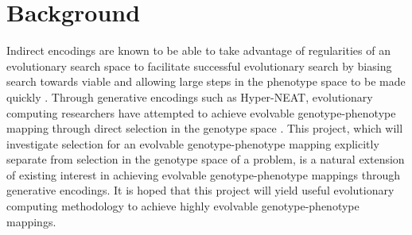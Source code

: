 \section{Background} \label{sec:background}

Indirect encodings are known to be able to take advantage of regularities of an evolutionary search space to facilitate successful evolutionary search by biasing search towards viable and allowing large steps in the phenotype space to be made quickly \cite{clune2009evolving}.
Through generative encodings such as Hyper-NEAT, evolutionary computing researchers have attempted to achieve evolvable genotype-phenotype mapping through direct selection in the genotype space \cite{mengistu2016evolvability}.
This project, which will investigate selection for an evolvable genotype-phenotype mapping explicitly separate from selection in the genotype space of a problem, is a natural extension of existing interest in achieving evolvable genotype-phenotype mappings through generative encodings.
It is hoped that this project will yield useful evolutionary computing methodology to achieve highly evolvable genotype-phenotype mappings.
